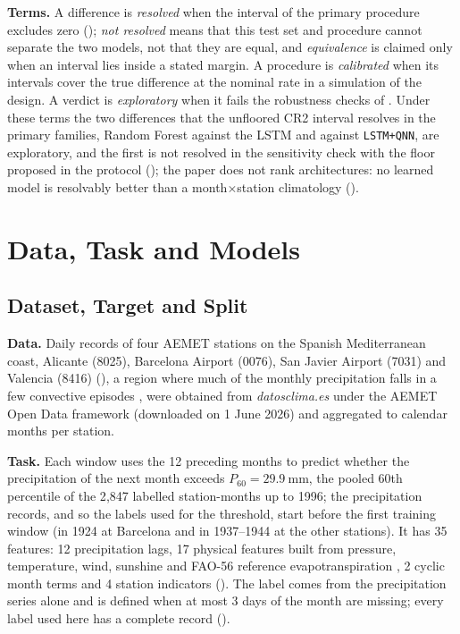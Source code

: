 \documentclass[11pt,a4paper]{article}
\begin{document}
\textbf{Terms.} A difference is \emph{resolved} when the interval of the primary procedure excludes zero (); \emph{not resolved} means that this test set and procedure cannot separate the two models, not that they are equal, and \emph{equivalence} is claimed only when an interval lies inside a stated margin. A procedure is \emph{calibrated} when its intervals cover the true difference at the nominal rate in a simulation of the design. A verdict is \emph{exploratory} when it fails the robustness checks of . Under these terms the two differences that the unfloored CR2 interval resolves in the primary families, Random Forest against the LSTM and against \texttt{LSTM+QNN}, are exploratory, and the first is not resolved in the sensitivity check with the floor proposed in the protocol (); the paper does not rank architectures: no learned model is resolvably better than a month$\times$station climatology ().

\section{Data, Task and Models}

\subsection{Dataset, Target and Split}
\label{sec:dataset_merge}

\textbf{Data.} Daily records of four AEMET stations on the Spanish Mediterranean coast, Alicante (8025), Barcelona Airport (0076), San Javier Airport (7031) and Valencia (8416) (), a region where much of the monthly precipitation falls in a few convective episodes \citep{romero1999,nieto2005}, were obtained from \textit{datosclima.es} under the AEMET Open Data framework (downloaded on 1 June 2026) and aggregated to calendar months per station.

\textbf{Task.} Each window uses the 12 preceding months to predict whether the precipitation of the next month exceeds $P_{60}=\qty{29.9}{\milli\meter}$, the pooled 60th percentile of the 2{,}847 labelled station-months up to 1996; the precipitation records, and so the labels used for the threshold, start before the first training window (in 1924 at Barcelona and in 1937--1944 at the other stations). It has 35 features: 12 precipitation lags, 17 physical features built from pressure, temperature, wind, sunshine and FAO-56 reference evapotranspiration \citep{allen1998}, 2 cyclic month terms and 4 station indicators (). The label comes from the precipitation series alone and is defined when at most 3 days of the month are missing; every label used here has a complete record ().
\end{document}
